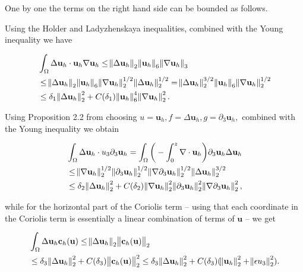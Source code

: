 \documentclass[11pt]{article}
\begin{document}
One by one the terms on the right hand side can be bounded as follows.

Using the Holder and Ladyzhenskaya inequalities, combined with the Young inequality we have

\begin{equation}
\begin{split}
 & \int_\Omega \Delta \mathbf{u}_h \cdot \mathbf{u}_h \nabla \mathbf{u}_h \leq \norm{\Delta \mathbf{u}_h}_2 \norm{\mathbf{u}_h}_6 \norm{\nabla \mathbf{u}_h}_3 \\
 & \leq \norm{\Delta \mathbf{u}_h}_2 \norm{\mathbf{u}_h}_6 \norm{\nabla \mathbf{u}_h}_2^{1/2} \norm{\Delta \mathbf{u}_h}_2^{1/2} = \norm{\Delta \mathbf{u}_h}_2^{3/2} \norm{\mathbf{u}_h}_6 \norm{\nabla \mathbf{u}_h}_2^{1/2} \\
 & \leq \delta_1 \norm{\Delta \mathbf{u}_h}_2^2 + C(\delta_1) \norm{\mathbf{u}_h}^4_6 \norm{\nabla \mathbf{u}_h}_2^2.
\end{split}
\end{equation}

Using Proposition 2.2 from \cite{cao2003global} choosing $u=\mathbf{u}_h, f = \Delta \mathbf{u}_h, g = \partial_3 \mathbf{u}_h,$ combined with the Young inequality we obtain 

\begin{equation}
\begin{split}
  & \int_\Omega \Delta \mathbf{u}_h \cdot u_3 \partial_3 \mathbf{u}_h = \int_\Omega \bigg( - \int_0^z \nabla \cdot \mathbf{u}_h \bigg) \partial_3 \mathbf{u}_h \Delta \mathbf{u}_h \\
  & \leq \norm{\nabla \mathbf{u}_h}_2^{1/2} \norm{\partial_3 \mathbf{u}_h}^{1/2}_2 \norm{\nabla \partial_3 \mathbf{u}_h}^{1/2}_2 \norm{\Delta \mathbf{u}_h}^{3/2}_2 \\
  & \leq \delta_2 \norm{\Delta \mathbf{u}_h}^2_2 + C(\delta_2) \norm{\nabla \mathbf{u}_h}_2^2 \norm{\partial_3 \mathbf{u}_h}^2_2 \norm{\nabla \partial_3 \mathbf{u}_h}^2_2,
\end{split}
\end{equation}

while for the horizontal part of the Coriolis term -- using that each coordinate in the Coriolis term is essentially a linear combination of terms of $\mathbf{u}$ -- we get

\begin{equation}
  \begin{split}
    & \int_\Omega \Delta \mathbf{u}_h \mathbf{c}_h (\mathbf{u}) \leq \norm{\Delta \mathbf{u}_h}_2 \norm{\mathbf{c}_h (\mathbf{u})}_2 \\
    & \leq \delta_3 \norm{\Delta \mathbf{u}_h}^2_2 + C(\delta_3) \norm{\mathbf{c}_h (\mathbf{u})}^2_2 \leq \delta_3 \norm{\Delta \mathbf{u}_h}^2_2 + C(\delta_3) (\norm{ \mathbf{u}_h}^2_2 + \norm{ \epsilon u_3}^2_2).
  \end{split}
\end{equation}
\end{document}
